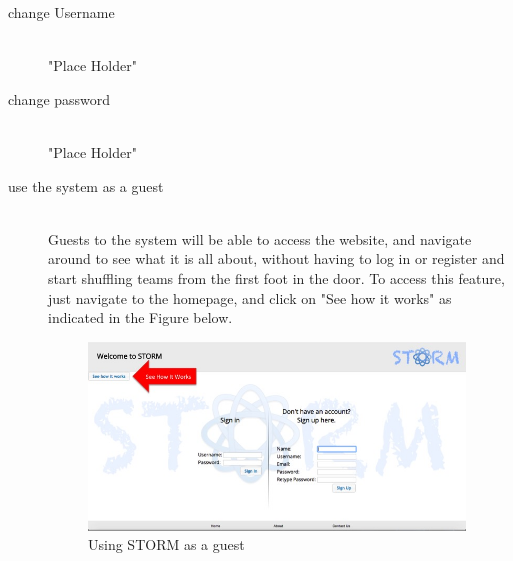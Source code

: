 \begin{description}
    	\item[change Username] \hfill \\
 		"Place Holder"
	\item[change password] \hfill \\
 		"Place Holder"
	\item[use the system as a guest] \hfill \\
 		Guests to the system will be able to access the website, and navigate around to see what it
		is all about, without having to log in or register and start shuffling teams from the first foot in 		the door. To access this feature, just navigate to the homepage, and click on "See how it 			works" as indicated in the Figure below.\par
		\begin{figure}[h!] 
		\centering  
		\includegraphics[width=10cm]{./graphics/StormUMSU3.jpg}
		\caption{Using STORM as a guest}
		\end{figure}
				
\end{description}